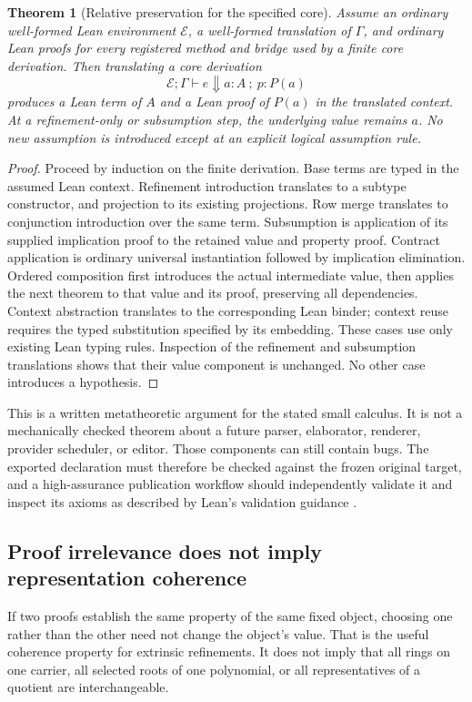 \documentclass[11pt,a4paper]{article}
\newtheorem{theorem}{Theorem}[section]
\theoremstyle{definition}
\begin{document}
\begin{theorem}[Relative preservation for the specified core]\label{thm:preservation}
Assume an ordinary well-formed Lean environment $\mathcal E$, a well-formed
translation of $\Gamma$, and ordinary Lean proofs for every registered method
and bridge used by a finite core derivation. Then translating a core derivation
\[
 \mathcal E;\Gamma\vdash e\Downarrow a:A\ ;\ p:P(a)
\]
produces a Lean term of $A$ and a Lean proof of $P(a)$ in the translated context.
At a refinement-only or subsumption step, the underlying value remains $a$.
No new assumption is introduced except at an explicit logical assumption rule.
\end{theorem}
\begin{proof}
Proceed by induction on the finite derivation. Base terms are typed in the
assumed Lean context. Refinement introduction translates to a subtype
constructor, and projection to its existing projections. Row merge translates
to conjunction introduction over the same term. Subsumption is application of
its supplied implication proof to the retained value and property proof.
Contract application is ordinary universal instantiation followed by implication
elimination. Ordered composition first introduces the actual intermediate
value, then applies the next theorem to that value and its proof, preserving
all dependencies. Context abstraction translates to the corresponding Lean
binder; context reuse requires the typed substitution specified by its
embedding. These cases use only existing Lean typing rules. Inspection of the
refinement and subsumption translations shows that their value component is
unchanged. No other case introduces a hypothesis.
\end{proof}

This is a written metatheoretic argument for the stated small calculus. It is
not a mechanically checked theorem about a future parser, elaborator, renderer,
provider scheduler, or editor. Those components can still contain bugs. The
exported declaration must therefore be checked against the frozen original
target, and a high-assurance publication workflow should independently validate
it and inspect its axioms as described by Lean's validation guidance
\cite{leanvalidation}.

\subsection{Proof irrelevance does not imply representation coherence}
If two proofs establish the same property of the same fixed object, choosing
one rather than the other need not change the object's value. That is the
useful coherence property for extrinsic refinements. It does not imply that
all rings on one carrier, all selected roots of one polynomial, or all
representatives of a quotient are interchangeable.
\end{document}
